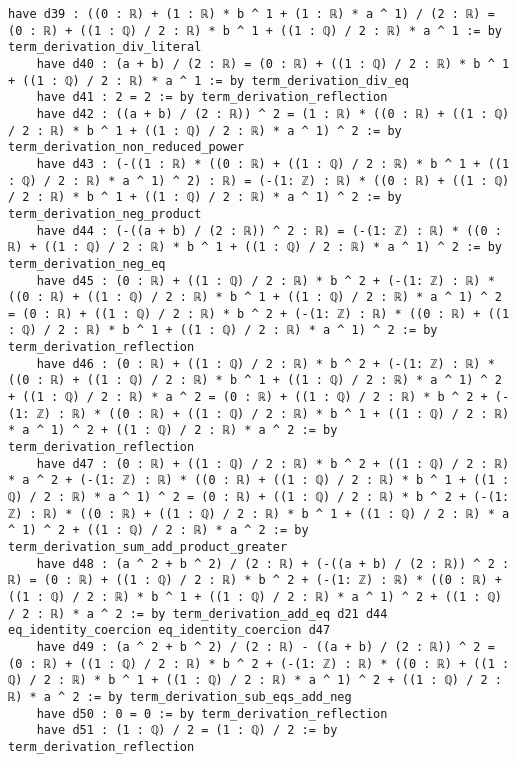 \documentclass{article}
\begin{document}
\begin{tcolorbox}[colback=white!10, width=\linewidth]
\begin{lstlisting}[language=Lean4]
    have d39 : ((0 : ℝ) + (1 : ℝ) * b ^ 1 + (1 : ℝ) * a ^ 1) / (2 : ℝ) = (0 : ℝ) + ((1 : ℚ) / 2 : ℝ) * b ^ 1 + ((1 : ℚ) / 2 : ℝ) * a ^ 1 := by term_derivation_div_literal
    have d40 : (a + b) / (2 : ℝ) = (0 : ℝ) + ((1 : ℚ) / 2 : ℝ) * b ^ 1 + ((1 : ℚ) / 2 : ℝ) * a ^ 1 := by term_derivation_div_eq
    have d41 : 2 = 2 := by term_derivation_reflection
    have d42 : ((a + b) / (2 : ℝ)) ^ 2 = (1 : ℝ) * ((0 : ℝ) + ((1 : ℚ) / 2 : ℝ) * b ^ 1 + ((1 : ℚ) / 2 : ℝ) * a ^ 1) ^ 2 := by term_derivation_non_reduced_power
    have d43 : (-((1 : ℝ) * ((0 : ℝ) + ((1 : ℚ) / 2 : ℝ) * b ^ 1 + ((1 : ℚ) / 2 : ℝ) * a ^ 1) ^ 2) : ℝ) = (-(1: ℤ) : ℝ) * ((0 : ℝ) + ((1 : ℚ) / 2 : ℝ) * b ^ 1 + ((1 : ℚ) / 2 : ℝ) * a ^ 1) ^ 2 := by term_derivation_neg_product
    have d44 : (-((a + b) / (2 : ℝ)) ^ 2 : ℝ) = (-(1: ℤ) : ℝ) * ((0 : ℝ) + ((1 : ℚ) / 2 : ℝ) * b ^ 1 + ((1 : ℚ) / 2 : ℝ) * a ^ 1) ^ 2 := by term_derivation_neg_eq
    have d45 : (0 : ℝ) + ((1 : ℚ) / 2 : ℝ) * b ^ 2 + (-(1: ℤ) : ℝ) * ((0 : ℝ) + ((1 : ℚ) / 2 : ℝ) * b ^ 1 + ((1 : ℚ) / 2 : ℝ) * a ^ 1) ^ 2 = (0 : ℝ) + ((1 : ℚ) / 2 : ℝ) * b ^ 2 + (-(1: ℤ) : ℝ) * ((0 : ℝ) + ((1 : ℚ) / 2 : ℝ) * b ^ 1 + ((1 : ℚ) / 2 : ℝ) * a ^ 1) ^ 2 := by term_derivation_reflection
    have d46 : (0 : ℝ) + ((1 : ℚ) / 2 : ℝ) * b ^ 2 + (-(1: ℤ) : ℝ) * ((0 : ℝ) + ((1 : ℚ) / 2 : ℝ) * b ^ 1 + ((1 : ℚ) / 2 : ℝ) * a ^ 1) ^ 2 + ((1 : ℚ) / 2 : ℝ) * a ^ 2 = (0 : ℝ) + ((1 : ℚ) / 2 : ℝ) * b ^ 2 + (-(1: ℤ) : ℝ) * ((0 : ℝ) + ((1 : ℚ) / 2 : ℝ) * b ^ 1 + ((1 : ℚ) / 2 : ℝ) * a ^ 1) ^ 2 + ((1 : ℚ) / 2 : ℝ) * a ^ 2 := by term_derivation_reflection
    have d47 : (0 : ℝ) + ((1 : ℚ) / 2 : ℝ) * b ^ 2 + ((1 : ℚ) / 2 : ℝ) * a ^ 2 + (-(1: ℤ) : ℝ) * ((0 : ℝ) + ((1 : ℚ) / 2 : ℝ) * b ^ 1 + ((1 : ℚ) / 2 : ℝ) * a ^ 1) ^ 2 = (0 : ℝ) + ((1 : ℚ) / 2 : ℝ) * b ^ 2 + (-(1: ℤ) : ℝ) * ((0 : ℝ) + ((1 : ℚ) / 2 : ℝ) * b ^ 1 + ((1 : ℚ) / 2 : ℝ) * a ^ 1) ^ 2 + ((1 : ℚ) / 2 : ℝ) * a ^ 2 := by term_derivation_sum_add_product_greater
    have d48 : (a ^ 2 + b ^ 2) / (2 : ℝ) + (-((a + b) / (2 : ℝ)) ^ 2 : ℝ) = (0 : ℝ) + ((1 : ℚ) / 2 : ℝ) * b ^ 2 + (-(1: ℤ) : ℝ) * ((0 : ℝ) + ((1 : ℚ) / 2 : ℝ) * b ^ 1 + ((1 : ℚ) / 2 : ℝ) * a ^ 1) ^ 2 + ((1 : ℚ) / 2 : ℝ) * a ^ 2 := by term_derivation_add_eq d21 d44 eq_identity_coercion eq_identity_coercion d47
    have d49 : (a ^ 2 + b ^ 2) / (2 : ℝ) - ((a + b) / (2 : ℝ)) ^ 2 = (0 : ℝ) + ((1 : ℚ) / 2 : ℝ) * b ^ 2 + (-(1: ℤ) : ℝ) * ((0 : ℝ) + ((1 : ℚ) / 2 : ℝ) * b ^ 1 + ((1 : ℚ) / 2 : ℝ) * a ^ 1) ^ 2 + ((1 : ℚ) / 2 : ℝ) * a ^ 2 := by term_derivation_sub_eqs_add_neg
    have d50 : 0 = 0 := by term_derivation_reflection
    have d51 : (1 : ℚ) / 2 = (1 : ℚ) / 2 := by term_derivation_reflection

\end{lstlisting}
\end{tcolorbox}
\end{document}
